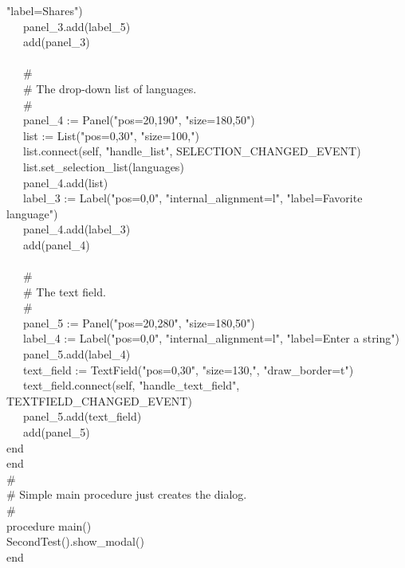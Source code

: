 {"label=Shares") \\
\>   \ \ \ panel\_3.add(label\_5) \\
\>   \ \ \ add(panel\_3) \\
\ \\
\>   \ \ \ \# \\
\>   \ \ \ \# The drop-down list of languages. \\
\>   \ \ \ \# \\
\>   \ \ \ panel\_4 := Panel("pos=20,190",
"size=180,50") \\
\>   \ \ \ list := List("pos=0,30",
"size=100,") \\
\>   \ \ \ list.connect(self,
"handle\_list", SELECTION\_CHANGED\_EVENT) \\
\>   \ \ \ list.set\_selection\_list(languages) \\
\>   \ \ \ panel\_4.add(list) \\
\>   \ \ \ label\_3 := Label("pos=0,0",
"internal\_alignment=l",
"label=Favorite language") \\
\>   \ \ \ panel\_4.add(label\_3) \\
\>   \ \ \ add(panel\_4) \\
\ \\
\>   \ \ \ \# \\
\>   \ \ \ \# The text field. \\
\>   \ \ \ \# \\
\>   \ \ \ panel\_5 := Panel("pos=20,280",
"size=180,50") \\
\>   \ \ \ label\_4 := Label("pos=0,0",
"internal\_alignment=l",
"label=Enter a string") \\
\>   \ \ \ panel\_5.add(label\_4) \\
\>   \ \ \ text\_field :=
TextField("pos=0,30",
"size=130,",
"draw\_border=t") \\
\>   \ \ \ text\_field.connect(self,
"handle\_text\_field",
TEXTFIELD\_CHANGED\_EVENT) \\
\>   \ \ \ panel\_5.add(text\_field) \\
\>   \ \ \ add(panel\_5) \\
\>   end \\
end \\
\# \\
\# Simple main procedure just creates the dialog. \\
\# \\
procedure main() \\
\>   SecondTest().show\_modal() \\
end
}


